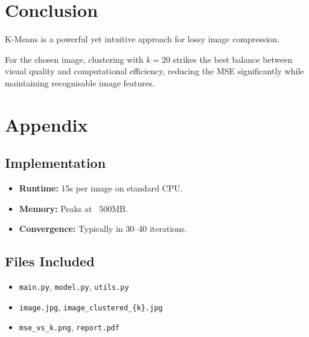 \documentclass{article}
\begin{document}
\section{Conclusion}
\begin{adjustwidth}{1cm}{}
K-Means is a powerful yet intuitive approach for lossy image compression. 

For the chosen image, clustering with \(k = 20\) strikes the best balance between visual quality and computational efficiency, reducing the MSE significantly while maintaining recognisable image features. \\
\end{adjustwidth}



\section*{Appendix}
\subsection*{Implementation}
\begin{itemize}
    \item \textbf{Runtime:} 15s per image on standard CPU.
    \item \textbf{Memory:} Peaks at ~500MB.
    \item \textbf{Convergence:} Typically in 30–40 iterations.
\end{itemize}

\subsection*{Files Included}
\begin{itemize}
    \item \texttt{main.py}, \texttt{model.py}, \texttt{utils.py}
    \item \texttt{image.jpg}, \texttt{image\_clustered\_\{k\}.jpg}
    \item \texttt{mse\_vs\_k.png}, \texttt{report.pdf}
\end{itemize}
\end{document}

